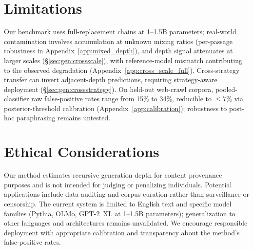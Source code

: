 \section*{Limitations}
\label{sec:limitations}

Our benchmark uses full-replacement chains at 1--1.5B parameters; real-world contamination involves accumulation at unknown mixing ratios (per-passage robustness in Appendix~\ref{app:mixed_depth}), and depth signal attenuates at larger scales (\S\ref{sec:gen:crossscale}), with reference-model mismatch contributing to the observed degradation (Appendix~\ref{app:cross_scale_full}).
Cross-strategy transfer can invert adjacent-depth predictions, requiring strategy-aware deployment (\S\ref{sec:gen:crossstrategy}).
On held-out web-crawl corpora, pooled-classifier raw false-positive rates range from 15\% to 34\%, reducible to ${\leq}$7\% via posterior-threshold calibration (Appendix~\ref{app:calibration}); robustness to post-hoc paraphrasing remains untested.

\section*{Ethical Considerations}
\label{sec:ethics}

Our method estimates recursive generation depth for content provenance purposes and is not intended for judging or penalizing individuals.
Potential applications include data auditing and corpus curation rather than surveillance or censorship.
The current system is limited to English text and specific model families (Pythia, OLMo, GPT-2~XL at 1--1.5B parameters); generalization to other languages and architectures remains unvalidated.
We encourage responsible deployment with appropriate calibration and transparency about the method's false-positive rates.
